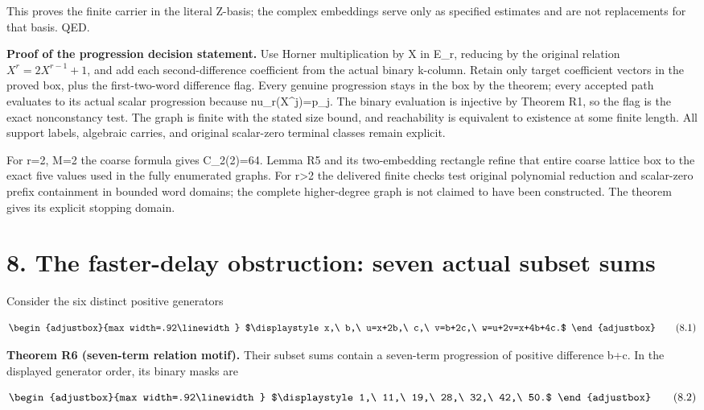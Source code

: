 This proves the finite carrier in the literal Z-basis; the complex embeddings serve only as specified estimates and are not replacements for that basis. QED.

\textbf{Proof of the progression decision statement.} Use Horner multiplication by X in E\_r, reducing by the original relation \(X^r=2X^{r-1}+1\), and add each second-difference coefficient from the actual binary k-column. Retain only target coefficient vectors in the proved box, plus the first-two-word difference flag. Every genuine progression stays in the box by the theorem; every accepted path evaluates to its actual scalar progression because nu\_r(X\^{}j)=p\_j. The binary evaluation is injective by Theorem R1, so the flag is the exact nonconstancy test. The graph is finite with the stated size bound, and reachability is equivalent to existence at some finite length. All support labels, algebraic carries, and original scalar-zero terminal classes remain explicit.

For r=2, M=2 the coarse formula gives C\_2(2)=64. Lemma R5 and its two-embedding rectangle refine that entire coarse lattice box to the exact five values used in the fully enumerated graphs. For r\textgreater2 the delivered finite checks test original polynomial reduction and scalar-zero prefix containment in bounded word domains; the complete higher-degree graph is not claimed to have been constructed. The theorem gives its explicit stopping domain.

\section{8. The faster-delay obstruction: seven actual subset sums}\label{n14-the-faster-delay-obstruction-seven-actual-subset-sums}

Consider the six distinct positive generators

\[
\begin{adjustbox}{max width=.92\linewidth}
$\displaystyle x,\ b,\ u=x+2b,\ c,\ v=b+2c,\ w=u+2v=x+4b+4c.$
\end{adjustbox}
\tag{8.1}
\]

\textbf{Theorem R6 (seven-term relation motif).} Their subset sums contain a seven-term progression of positive difference b+c. In the displayed generator order, its binary masks are

\[
\begin{adjustbox}{max width=.92\linewidth}
$\displaystyle 1,\ 11,\ 19,\ 28,\ 32,\ 42,\ 50.$
\end{adjustbox}
\tag{8.2}
\]

